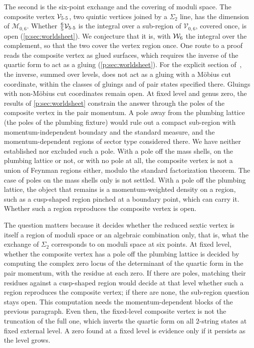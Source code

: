 The second is the six-point exchange and the covering of moduli space.
The composite vertex $\mathcal{V}_{5 \cdot 5}$, two quintic vertices joined by a $\Sigma_2$ line, has the dimension of $\mathcal M_{0,6}$.
Whether $\tfrac{6}{5} \mathcal{V}_{5 \cdot 5}$ is the integral over a sub-region of $\mathcal V_{0,6}$, covered once, is open (\cref{p:sec:worldsheet}).
We conjecture that it is, with $\mathcal{W}_{6}$ the integral over the complement, so that the two cover the vertex region once.
  One route to a proof reads the composite vertex as glued surfaces, which requires the inverse of the quartic form to act as a gluing (\cref{p:sec:worldsheet}).
  For the explicit section of~\cite{Erbin:2026:SL2CVerticesClosed}, the inverse, summed over levels, does not act as a gluing with a Möbius cut coordinate, within the classes of gluings and of pair states specified there.
  Gluings with non-Möbius cut coordinates remain open.
At fixed level and genus zero, the results of \cref{p:sec:worldsheet} constrain the answer through the poles of the composite vertex in the pair momentum.
  A pole away from the plumbing lattice (the poles of the plumbing fixture) would rule out a compact sub-region with momentum-independent boundary and the standard measure, and the momentum-dependent regions of sector type considered there.
  We have neither established nor excluded such a pole.
  With a pole off the mass shells, on the plumbing lattice or not, or with no pole at all, the composite vertex is not a union of Feynman regions either, modulo the standard factorization theorem.
  The case of poles on the mass shells only is not settled.
  With a pole off the plumbing lattice, the object that remains is a momentum-weighted density on a region, such as a cusp-shaped region pinched at a boundary point, which can carry it.
  Whether such a region reproduces the composite vertex is open.

The question matters because it decides whether the reduced sextic vertex is itself a region of moduli space or an algebraic combination only, that is, what the exchange of $\Sigma_2$ corresponds to on moduli space at six points.
At fixed level, whether the composite vertex has a pole off the plumbing lattice is decided by computing the complex zero locus of the determinant of the quartic form in the pair momentum, with the residue at each zero.
If there are poles, matching their residues against a cusp-shaped region would decide at that level whether such a region reproduces the composite vertex; if there are none, the sub-region question stays open.
This computation needs the momentum-dependent blocks of the previous paragraph.
Even then, the fixed-level composite vertex is not the truncation of the full one, which inverts the quartic form on all $2$-string states at fixed external level.
A zero found at a fixed level is evidence only if it persists as the level grows.

